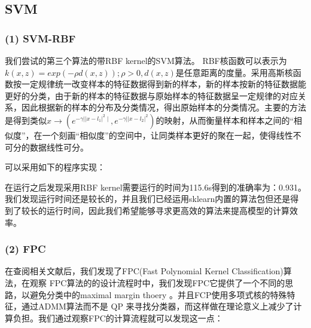 \documentclass{zjureport}
\begin{document}
    
    
    
    
    \subsection{SVM}
        \subsubsection{(1) SVM-RBF}
        我们尝试的第三个算法的带RBF kernel的SVM算法。 RBF核函数可以表示为$k(x,z)=exp(-\rho d(x,z));\rho >0,d(x,z)$是任意距离的度量。采用高斯核函数按一定规律统一改变样本的特征数据得到新的样本，新的样本按新的特征数据能更好的分类，由于新的样本的特征数据与原始样本的特征数据呈一定规律的对应关系，因此根据新的样本的分布及分类情况，得出原始样本的分类情况。主要的方法是得到类似$
x \rightarrow\left(e^{-\gamma|| x-\left.l_{1}\right|^{2} \mid}, e^{-\gamma|| x-\left.l_{2}\right|^{2}}\right)
$的映射，从而衡量样本和样本之间的“相似度”，在一个刻画“相似度”的空间中，让同类样本更好的聚在一起，使得线性不可分的数据线性可分。

可以采用如下的程序实现：
        
       在运行之后发现采用RBF kernel需要运行的时间为115.6s得到的准确率为：0.931。我们发现运行时间还是较长的，并且我们已经运用sklearn内置的算法包但还是得到了较长的运行时间，因此我们希望能够寻求更高效的算法来提高模型的计算效率。   
        \subsubsection{(2) FPC}
        在查阅相关文献后，我们发现了FPC(Fast Polynomial Kernel Classification)算法，在观察 FPC算法的的设计流程时中，我们发现FPC它提供了一个不同的思路，以避免分类中的maximal margin thoery 。并且FCP使用多项式核的特殊特征，通过ADMM算法而不是 QP 来寻找分类器，而这样做在理论意义上减少了计算负担。我们通过观察FPC的计算流程就可以发现这一点：
\end{document}
